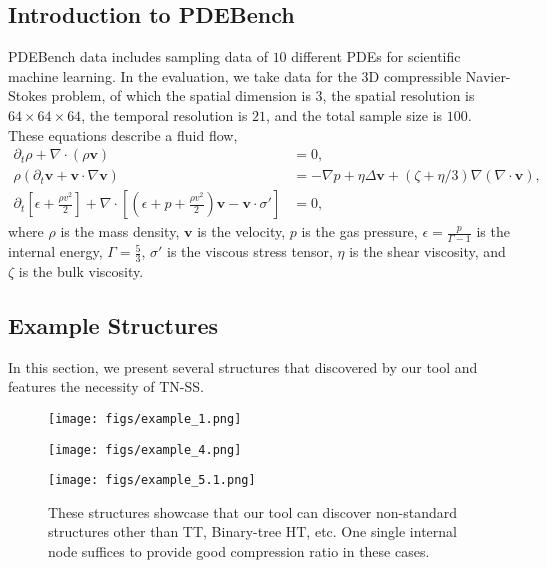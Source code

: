 \subsection{Introduction to PDEBench}
%
PDEBench data includes sampling data of $10$ different PDEs for scientific machine learning.
%
In the evaluation, we take data for the 3D compressible Navier-Stokes problem, of which the spatial dimension is $3$, the spatial resolution is $64 \times 64 \times 64$, the temporal resolution is $21$, and the total sample size is $100$.
%
These equations describe a fluid flow,
\begin{align*}
\partial_t \rho + \nabla \cdot (\rho \mathbf{v}) &= 0, \\
\rho (\partial_t \mathbf{v} + \mathbf{v} \cdot \nabla \mathbf{v}) &= -\nabla p + \eta \Delta \mathbf{v} + (\zeta + \eta / 3) \nabla (\nabla \cdot \mathbf{v}), \\
\partial_t \left[ \epsilon + \frac{\rho v^2}{2} \right] + \nabla \cdot \left[ \left( \epsilon + p + \frac{\rho v^2}{2} \right) \mathbf{v} - \mathbf{v} \cdot \sigma' \right] &= 0,
\end{align*}
where $\rho$ is the mass density, $\mathbf{v}$ is the velocity, $p$ is the gas pressure, $\epsilon = \frac{p}{\Gamma - 1}$ is the internal energy, $\Gamma = \frac{5}{3}$, $\sigma'$ is the viscous stress tensor, $\eta$ is the shear viscosity, and $\zeta$ is the bulk viscosity.

\subsection{Example Structures}
In this section, we present several structures that discovered by our tool and features the necessity of TN-SS.
\begin{figure}[h]
    \centering
    \begin{minipage}{0.33\linewidth}
        \texttt{[image: figs/example\_1.png]}
    \end{minipage}
    \begin{minipage}{0.33\linewidth}
        \texttt{[image: figs/example\_4.png]}
    \end{minipage}
    \begin{minipage}{0.33\linewidth}
        \texttt{[image: figs/example\_5.1.png]}
    \end{minipage}
    \caption{These structures showcase that our tool can discover non-standard structures other than TT, Binary-tree HT, etc. One single internal node suffices to provide good compression ratio in these cases.}
    \label{fig:appendix:non-standard}
\end{figure}

